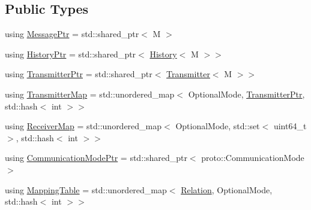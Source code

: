 \subsection*{Public Types}
\begin{DoxyCompactItemize}
\item 
using \hyperlink{classapollo_1_1cyber_1_1transport_1_1HybridTransmitter_ae4da0fb39a90d084d271b8522afc0881}{Message\-Ptr} = std\-::shared\-\_\-ptr$<$ M $>$
\item 
using \hyperlink{classapollo_1_1cyber_1_1transport_1_1HybridTransmitter_aee5ef32dcbaab6fcd68459e5f5afd6d8}{History\-Ptr} = std\-::shared\-\_\-ptr$<$ \hyperlink{classapollo_1_1cyber_1_1transport_1_1History}{History}$<$ M $>$$>$
\item 
using \hyperlink{classapollo_1_1cyber_1_1transport_1_1HybridTransmitter_ab5d6589b441adbb0aeebde895b21c569}{Transmitter\-Ptr} = std\-::shared\-\_\-ptr$<$ \hyperlink{classapollo_1_1cyber_1_1transport_1_1Transmitter}{Transmitter}$<$ M $>$$>$
\item 
using \hyperlink{classapollo_1_1cyber_1_1transport_1_1HybridTransmitter_a79fe84264b152838a2a921ca7c428d31}{Transmitter\-Map} = std\-::unordered\-\_\-map$<$ Optional\-Mode, \hyperlink{classapollo_1_1cyber_1_1transport_1_1HybridTransmitter_ab5d6589b441adbb0aeebde895b21c569}{Transmitter\-Ptr}, std\-::hash$<$ int $>$$>$
\item 
using \hyperlink{classapollo_1_1cyber_1_1transport_1_1HybridTransmitter_a57d8d230cedd2328577b9789ab964a5c}{Receiver\-Map} = std\-::unordered\-\_\-map$<$ Optional\-Mode, std\-::set$<$ uint64\-\_\-t $>$, std\-::hash$<$ int $>$$>$
\item 
using \hyperlink{classapollo_1_1cyber_1_1transport_1_1HybridTransmitter_aebca8e1bc93bfde3563c0c8b8c92bfa9}{Communication\-Mode\-Ptr} = std\-::shared\-\_\-ptr$<$ proto\-::\-Communication\-Mode $>$
\item 
using \hyperlink{classapollo_1_1cyber_1_1transport_1_1HybridTransmitter_a7073fcd5fe2232785a883a3f494d00ed}{Mapping\-Table} = std\-::unordered\-\_\-map$<$ \hyperlink{namespaceapollo_1_1cyber_a688ac951fd0a3965da4acdc34c92e50f}{Relation}, Optional\-Mode, std\-::hash$<$ int $>$$>$
\end{DoxyCompactItemize}
